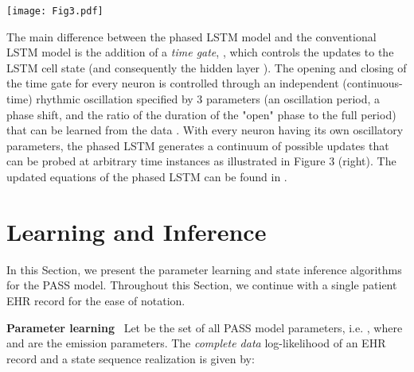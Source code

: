 \documentclass[twoside,11pt]{article}
\begin{document}
\begin{figure*}[t]
  \centering
  \texttt{[image: Fig3.pdf]}
	\label{Fig3}
\end{figure*}

The main difference between the phased LSTM model and the conventional LSTM model is the addition of a {\it time gate}, \mbox{\footnotesize }, which controls the updates to the LSTM cell state \mbox{\footnotesize } (and consequently the hidden layer \mbox{\footnotesize }). The opening and closing of the time gate \mbox{\footnotesize } for every neuron is controlled through an independent (continuous-time) rhythmic oscillation specified by 3 parameters (an oscillation period, a phase shift, and the ratio of the duration of the "open" phase to the full period) that can be learned from the data \cite{neil2016phased}. With every neuron having its own oscillatory parameters, the phased LSTM generates a continuum of possible updates that can be probed at arbitrary time instances as illustrated in Figure 3 (right). The updated equations of the phased LSTM can be found in \cite{neil2016phased}.   

\section{Learning and Inference}
\label{Sec4}
In this Section, we present the parameter learning and state inference algorithms for the PASS model. Throughout this Section, we continue with a single patient EHR record for the ease of notation.

{\bf Parameter learning}\,\,\, Let \mbox{\footnotesize } be the set of all PASS model parameters, i.e. \mbox{\footnotesize }, where \mbox{\footnotesize } and \mbox{\footnotesize } are the emission parameters. The {\it complete data} log-likelihood of an EHR record \mbox{\footnotesize } and a state sequence realization \mbox{\footnotesize } is given by:  
\end{document}
